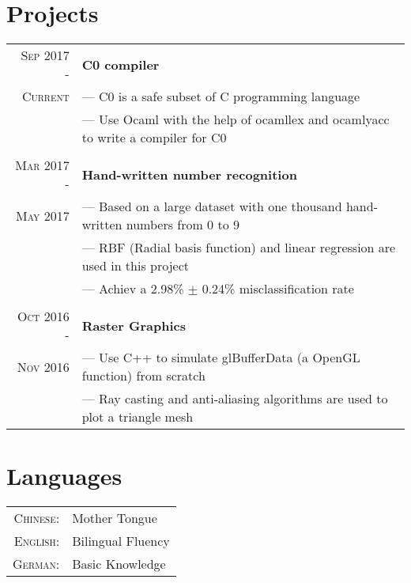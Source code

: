 \documentclass[a4paper,10pt]{article}
\begin{document}
	\section{Projects}
	\begin{tabular}{r | l}
	    \textsc{Sep 2017 - } & \textbf{C0 compiler} \\\textsc{Current}& --- C0 is a safe subset of C programming language
	    \\& --- Use Ocaml with the help of ocamllex and ocamlyacc to write a compiler for C0
		\\ \multicolumn{1}{c}{} \\
		\textsc{Mar 2017 - } & \textbf{Hand-written number recognition} \\\textsc{May 2017}& --- Based on a large dataset with one thousand hand-written numbers from 0 to 9
		\\& --- RBF (Radial basis function) and linear regression are used in this project
		\\& --- Achiev a 2.98\% $\pm$ 0.24\% misclassification rate
		\\ \multicolumn{1}{c}{} \\
		\textsc{Oct 2016 - } & \textbf{Raster Graphics} 
		\\\textsc{Nov 2016}& --- Use C++ to simulate glBufferData (a OpenGL function) from scratch
		\\& --- Ray casting and anti-aliasing algorithms are used to plot a triangle mesh
	\end{tabular}
	
	\section{Languages}
	\begin{tabular}{rl}
		\textsc{Chinese:}& Mother Tongue\\
		\textsc{English:}& Bilingual Fluency\\
		\textsc{German:}& Basic Knowledge\\
	\end{tabular}
	
\end{document}
